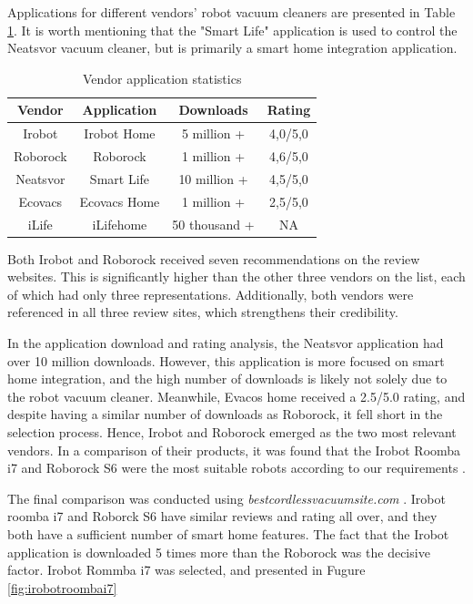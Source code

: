 Applications for different vendors' robot vacuum cleaners are presented in Table \ref{tab:VendorApplicationStat}. It is worth mentioning that the "Smart Life" application is used to control the Neatsvor vacuum cleaner, but is primarily a smart home integration application. 

\begin{table}[H]
\centering
\caption{Vendor application statistics}
\label{tab:VendorApplicationStat}
\begin{tabular}{|c|c|c|c|}
\hline
\textbf{Vendor} & \textbf{Application} & \textbf{Downloads} & \textbf{Rating} \\ \hline
Irobot          & Irobot Home          & 5 million +        & 4,0/5,0         \\ \hline
Roborock        & Roborock             & 1 million +        & 4,6/5,0         \\ \hline
Neatsvor        & Smart Life           & 10 million +       & 4,5/5,0         \\ \hline
Ecovacs         & Ecovacs Home         & 1 million +        & 2,5/5,0         \\ \hline
iLife           & iLifehome            & 50 thousand +      & NA              \\ \hline
\end{tabular}
\end{table}
Both Irobot and Roborock received seven recommendations on the review websites. This is significantly higher than the other three vendors on the list, each of which had only three representations. Additionally, both vendors were referenced in all three review sites, which strengthens their credibility. 

In the application download and rating analysis, the Neatsvor application had over 10 million downloads. However, this application is more focused on smart home integration, and the high number of downloads is likely not solely due to the robot vacuum cleaner. Meanwhile, Evacos home received a 2.5/5.0 rating, and despite having a similar number of downloads as Roborock, it fell short in the selection process. Hence, Irobot and Roborock emerged as the two most relevant vendors. In a comparison of their products, it was found that the Irobot Roomba i7 and Roborock S6 were the most suitable robots according to our requirements \cite{robotsel8} \cite{robotsel6}. 

The final comparison was conducted using \textit{bestcordlessvacuumsite.com} \cite{robotsel9}. Irobot roomba i7 and Roborck S6 have similar reviews and rating all over, and they both have a sufficient number of smart home features. The fact that the Irobot application is downloaded 5 times more than the Roborock was the decisive factor. Irobot Rommba i7 was selected, and presented in Fugure \ref{fig:irobotroombai7} 

